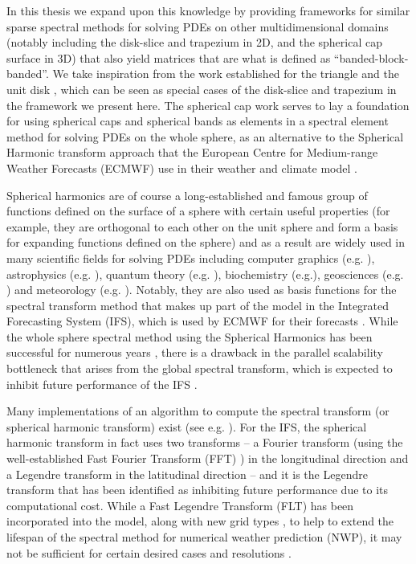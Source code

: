 In this thesis we expand upon this knowledge by providing frameworks for similar sparse spectral methods for solving PDEs on other multidimensional domains (notably including the disk-slice and trapezium in 2D, and the spherical cap surface in 3D) that also yield matrices that are what is defined as \enquote{banded-block-banded}. We take inspiration from the work established for the triangle \cite{olver2019triangle} and the unit disk \cite{vasil2016tensor}, which can  be seen as special cases of the disk-slice and trapezium in the framework we present here. The spherical cap work serves to lay a foundation for using spherical caps and spherical bands as elements in a spectral element method for solving PDEs on the whole sphere, as an alternative to the Spherical Harmonic transform approach that the European Centre for Medium-range Weather Forecasts (ECMWF) use in their weather and climate model \cite{cheong2006dynamical}. 

Spherical harmonics are of course a long-established and famous group of functions defined on the surface of a sphere with certain useful properties (for example, they are orthogonal to each other on the unit sphere and form a basis for expanding functions defined on the sphere) and as a result are widely used in many scientific fields for solving PDEs including computer graphics (e.g. \cite{moon2008efficient, sloan2013efficient}), astrophysics (e.g. \cite{vasil2019tensor}), quantum theory (e.g. \cite{varshalovich1988quantum}), biochemistry (e.g.\cite{parimal2014application, basko1998application}), geosciences (e.g. \cite{hollerbach2013parity}) and meteorology (e.g. \cite{evans1998spherical, rubinstein2015scalar, wedi2013fast, ecmwf2020scalability, diamantakisecmwf, courtier1998ecmwf}). Notably, they are also used as basis functions for the spectral transform method that makes up part of the model in the Integrated Forecasting System (IFS), which is used by ECMWF for their forecasts \cite{wedi2013fast}. While the whole sphere spectral method using the Spherical Harmonics has been successful for numerous years \cite{williamson2007evolution}, there is a drawback in the parallel scalability bottleneck that arises from the global spectral transform, which is expected to inhibit future performance of the IFS \cite{ecmwf2020scalability, wedi2013fast, diamantakisecmwf}. 

Many implementations of an algorithm to compute the spectral transform (or spherical harmonic transform) exist (see e.g. \cite{slevinsky2019fast, suda2002fast}). For the IFS, the spherical harmonic transform in fact uses two transforms -- a Fourier transform (using the well-established Fast Fourier Transform (FFT) \cite{cooley1965algorithm}) in the longitudinal direction and a Legendre transform in the latitudinal direction -- and it is the Legendre transform that has been identified as inhibiting future performance due to its computational cost. While a Fast Legendre Transform (FLT) \cite{wedi2013fast} has been incorporated into the model, along with new grid types \cite{malardel2016new}, to help to extend the lifespan of the spectral method for numerical weather prediction (NWP), it may not be sufficient for certain desired cases and resolutions \cite{diamantakisecmwf}. 

